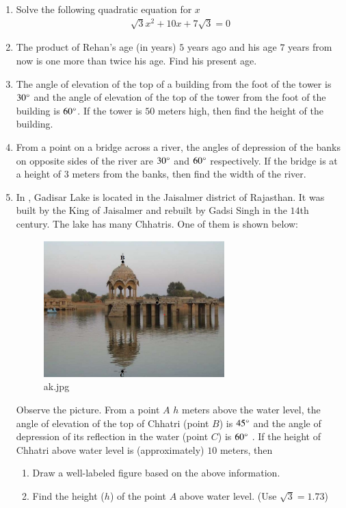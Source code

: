 \documentclass{article}
\theoremstyle{remark}
\begin{document}
\begin{enumerate}
    \item Solve the following quadratic equation for $x$ 
    \begin{align}
        \sqrt{3}x^2 + 10x + 7\sqrt{3} = 0
    \end{align}
    \item  The product of Rehan's age (in years) $5$ years ago and his age $7$ years from now is one more than twice his age. Find his present age.
    \item The angle of elevation of the top of a building from the foot of the tower is $30\degree$ and the angle of elevation of the top of the tower from the foot of the building is $60\degree$. If the tower is $50$ meters high, then find the height of the building.
    \item From a point on a bridge across a river, the angles of depression of the banks on opposite sides of the river are $30\degree$ and $60\degree$ respectively. If the bridge is at a height of $3$ meters from the banks, then find the width of the river. 
    \item In , Gadisar Lake is located in the Jaisalmer district of Rajasthan. It was built by the King of Jaisalmer and rebuilt by Gadsi Singh in the $14$th century. The lake has many Chhatris. One of them is shown below:
    \begin{figure}[H]
        \centering
    	 \includegraphics[width=70mm]{figs/ak.jpeg}
        \caption{ak.jpg}
        \label{fig:ak}
    \end{figure}
    Observe the picture. From a point $A$ $h$ meters above the water level, the angle of elevation of the top of Chhatri (point $B$) is $45\degree$ and the angle of depression of its reflection in the water (point $C$) is $60\degree$ . If the height of Chhatri above water level is (approximately) $10$ meters, then 
    \begin{enumerate}
        \item Draw a well-labeled figure based on the above information.
        \item Find the height ($h$) of the point $A$ above water level. (Use $\sqrt{3}=1.73$) 
    \end{enumerate}


\end{enumerate}
\end{document}
